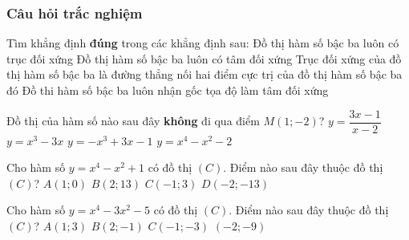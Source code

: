 \subsubsection{Câu hỏi trắc nghiệm}
\begin{ex}%
	Tìm khẳng định \textbf{đúng} trong các khẳng định sau: 
	\choice
	{Đồ thị hàm số bậc ba luôn có trục đối xứng}
	{\True Đồ thị hàm số bậc ba luôn có tâm đối xứng}
	{Trục đối xứng của đồ thị hàm số bậc ba là đường thẳng nối hai điểm cực trị của đồ thị hàm số bậc ba đó}
	{Đồ thi hàm số bậc ba luôn nhận gốc tọa độ làm tâm đối xứng}
\end{ex}
\begin{ex}%
	Đồ thị của hàm số nào sau đây \textbf{không} đi qua điểm $M(1;-2)$?
	\choice
	{$y=\dfrac{3x-1}{x-2}$}
	{$y=x^3-3x$}
	{\True $y=-x^3+3x-1$}
	{$y=x^4-x^2-2$}
\end{ex}
\begin{ex}%
	Cho hàm số $y=x^4-x^2+1$ có đồ thị $(C)$. Điểm nào sau đây thuộc đồ thị $(C)$?
	\choice
	{$A(1;0)$}
	{\True $B(2;13)$}
	{$C(-1;3)$}
	{$D(-2;-13)$}
\end{ex}
\begin{ex}%
	Cho hàm số $y=x^4-3x^2-5$ có đồ thị $(C)$. Điểm nào sau đây thuộc đồ thị $(C)$?
	\choice
	{$A(1;3)$}
	{\True $B(2;-1)$}
	{$C(-1;-3)$}
	{$(-2;-9)$}
\end{ex}

